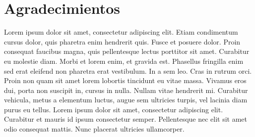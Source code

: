 \documentclass[colTwo]{NanouparIEEE}
\begin{document}
    \section{Agradecimientos}
        Lorem ipsum dolor sit amet, consectetur adipiscing elit. Etiam condimentum cursus dolor, quis pharetra enim hendrerit quis. Fusce et posuere dolor. Proin consequat faucibus magna, quis pellentesque lectus porttitor sit amet. Curabitur eu molestie diam. Morbi et lorem enim, et gravida est. Phasellus fringilla enim sed erat eleifend non pharetra erat vestibulum. In a sem leo. Cras in rutrum orci. Proin non quam sit amet lorem lobortis tincidunt eu vitae massa. Vivamus eros dui, porta non suscipit in, cursus in nulla. Nullam vitae hendrerit mi. Curabitur vehicula, metus a elementum luctus, augue sem ultricies turpis, vel lacinia diam purus eu tellus. Lorem ipsum dolor sit amet, consectetur adipiscing elit. Curabitur et mauris id ipsum consectetur semper. Pellentesque nec elit sit amet odio consequat mattis. Nunc placerat ultricies ullamcorper.


    
    
    
\end{document}
